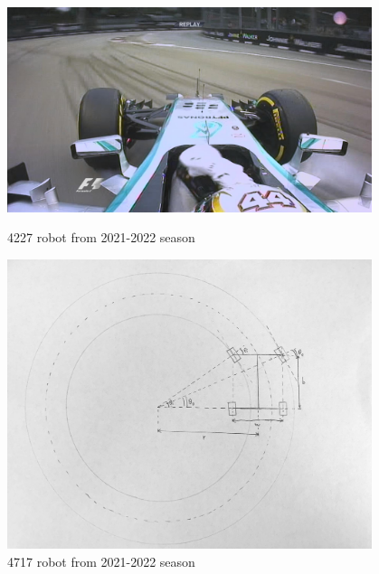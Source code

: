 \begin{figure}[ht]
\centering
\begin{minipage}[b]{.48\textwidth}
  \centering
  \includegraphics[width=0.95\textwidth]{Meetings/October/10-06-22/10-6-22_CAD_Figure1.jpg}
  \caption{4227 robot from 2021-2022 season}
  \label{fig:pic1}
\end{minipage}%
\hfill%
\begin{minipage}[b]{.48\textwidth}
  \centering
  \includegraphics[width=0.95\textwidth]{Meetings/October/10-06-22/10-6-22_CAD_Figure3.png}
  \caption{4717 robot from 2021-2022 season}
  \label{fig:pic2}
\end{minipage}
\end{figure}

